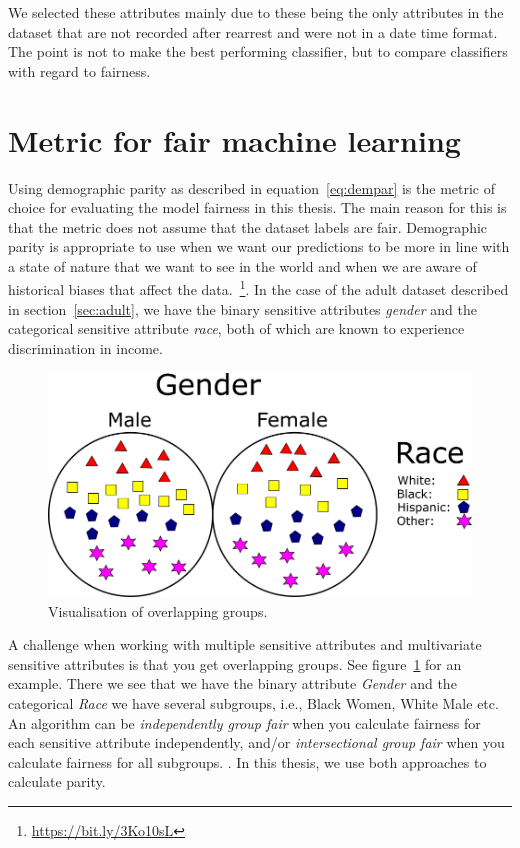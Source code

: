 We selected these attributes mainly due to these being the only attributes in the dataset that are not recorded after rearrest and were not in a date time format. The point is not to make the best performing classifier, but to compare classifiers with regard to fairness.

\section{Metric for fair machine learning}

Using demographic parity as described in equation~\ref{eq:dempar} is the metric of choice for evaluating the model fairness in this thesis. The main reason for this is that the metric does not assume that the dataset labels are fair. Demographic parity is appropriate to use when we want our predictions to be more in line with a state of nature that we want to see in the world and when we are aware of historical biases that affect the data.~\footnote{\url{https://bit.ly/3Ko10sL}}. In the case of the adult dataset described in section~\ref{sec:adult}, we have the binary sensitive attributes \emph{gender} and the categorical sensitive attribute \emph{race}, both of which are known to experience discrimination in income. 

\begin{figure}
    \centering
    \includegraphics[width=0.7\linewidth]{figures/GroupOverlap.png}
    \caption{Visualisation of overlapping groups.}
    \label{fig:overlap}
\end{figure}

A challenge when working with multiple sensitive attributes and multivariate sensitive attributes is that you get overlapping groups. See figure~\ref{fig:overlap} for an example. There we see that we have the binary attribute \emph{Gender} and the categorical \emph{Race} we have several subgroups, i.e., Black Women, White Male etc. An algorithm can be \emph{independently group fair} when you calculate fairness for each sensitive attribute independently, and/or \emph{intersectional group fair} when you calculate fairness for all subgroups. \cite{Yang:2020:CoRR}. In this thesis, we use both approaches to calculate parity. 

